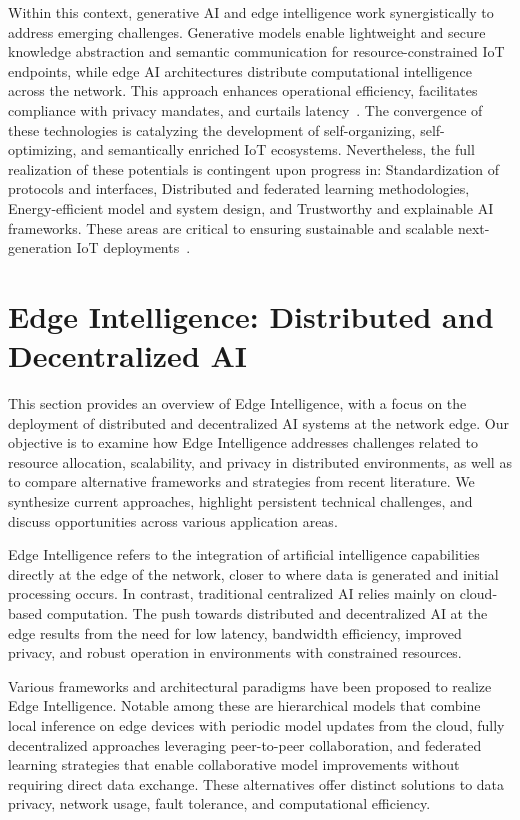 \documentclass[sigconf]{acmart}
\begin{document}
Within this context, generative AI and edge intelligence work synergistically to address emerging challenges. Generative models enable lightweight and secure knowledge abstraction and semantic communication for resource-constrained IoT endpoints, while edge AI architectures distribute computational intelligence across the network. This approach enhances operational efficiency, facilitates compliance with privacy mandates, and curtails latency~\cite{ref44,ref45,ref49}. The convergence of these technologies is catalyzing the development of self-organizing, self-optimizing, and semantically enriched IoT ecosystems. Nevertheless, the full realization of these potentials is contingent upon progress in:
Standardization of protocols and interfaces,
Distributed and federated learning methodologies,
Energy-efficient model and system design, and
Trustworthy and explainable AI frameworks.
These areas are critical to ensuring sustainable and scalable next-generation IoT deployments~\cite{ref44,ref45}.

\section{Edge Intelligence: Distributed and Decentralized AI}

This section provides an overview of Edge Intelligence, with a focus on the deployment of distributed and decentralized AI systems at the network edge. Our objective is to examine how Edge Intelligence addresses challenges related to resource allocation, scalability, and privacy in distributed environments, as well as to compare alternative frameworks and strategies from recent literature. We synthesize current approaches, highlight persistent technical challenges, and discuss opportunities across various application areas.

Edge Intelligence refers to the integration of artificial intelligence capabilities directly at the edge of the network, closer to where data is generated and initial processing occurs. In contrast, traditional centralized AI relies mainly on cloud-based computation. The push towards distributed and decentralized AI at the edge results from the need for low latency, bandwidth efficiency, improved privacy, and robust operation in environments with constrained resources.

Various frameworks and architectural paradigms have been proposed to realize Edge Intelligence. Notable among these are hierarchical models that combine local inference on edge devices with periodic model updates from the cloud, fully decentralized approaches leveraging peer-to-peer collaboration, and federated learning strategies that enable collaborative model improvements without requiring direct data exchange. These alternatives offer distinct solutions to data privacy, network usage, fault tolerance, and computational efficiency.
\end{document}
